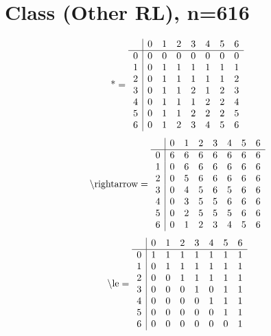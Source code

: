 \documentclass[11pt]{article}
\begin{document}
\section{Class (Other RL), n=616}
\[\text{*} = 
\begin{array}{r | r r r r r r r}
 & 0 & 1 & 2 & 3 & 4 & 5 & 6 \\ \hline
0 & 0 & 0 & 0 & 0 & 0 & 0 & 0 \\
1 & 0 & 1 & 1 & 1 & 1 & 1 & 1 \\
2 & 0 & 1 & 1 & 1 & 1 & 1 & 2 \\
3 & 0 & 1 & 1 & 2 & 1 & 2 & 3 \\
4 & 0 & 1 & 1 & 1 & 2 & 2 & 4 \\
5 & 0 & 1 & 1 & 2 & 2 & 2 & 5 \\
6 & 0 & 1 & 2 & 3 & 4 & 5 & 6 \\
\end{array}
\]
\[\text{\textbackslash rightarrow} = 
\begin{array}{r | r r r r r r r}
 & 0 & 1 & 2 & 3 & 4 & 5 & 6 \\ \hline
0 & 6 & 6 & 6 & 6 & 6 & 6 & 6 \\
1 & 0 & 6 & 6 & 6 & 6 & 6 & 6 \\
2 & 0 & 5 & 6 & 6 & 6 & 6 & 6 \\
3 & 0 & 4 & 5 & 6 & 5 & 6 & 6 \\
4 & 0 & 3 & 5 & 5 & 6 & 6 & 6 \\
5 & 0 & 2 & 5 & 5 & 5 & 6 & 6 \\
6 & 0 & 1 & 2 & 3 & 4 & 5 & 6 \\
\end{array}
\]
\[\text{\textbackslash le} = 
\begin{array}{r | r r r r r r r}
 & 0 & 1 & 2 & 3 & 4 & 5 & 6 \\ \hline
0 & 1 & 1 & 1 & 1 & 1 & 1 & 1 \\
1 & 0 & 1 & 1 & 1 & 1 & 1 & 1 \\
2 & 0 & 0 & 1 & 1 & 1 & 1 & 1 \\
3 & 0 & 0 & 0 & 1 & 0 & 1 & 1 \\
4 & 0 & 0 & 0 & 0 & 1 & 1 & 1 \\
5 & 0 & 0 & 0 & 0 & 0 & 1 & 1 \\
6 & 0 & 0 & 0 & 0 & 0 & 0 & 1 \\
\end{array}
\]
\end{document}
